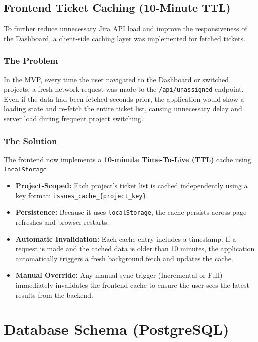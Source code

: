\documentclass[12pt, a4paper]{article}
\begin{document}
\subsection{Frontend Ticket Caching (10-Minute TTL)}

To further reduce unnecessary Jira API load and improve the responsiveness of the Dashboard, a client-side caching layer was implemented for fetched tickets.

\subsubsection{The Problem}
In the MVP, every time the user navigated to the Dashboard or switched projects, a fresh network request was made to the \texttt{/api/unassigned} endpoint. Even if the data had been fetched seconds prior, the application would show a loading state and re-fetch the entire ticket list, causing unnecessary delay and server load during frequent project switching.

\subsubsection{The Solution}
The frontend now implements a \textbf{10-minute Time-To-Live (TTL)} cache using \texttt{localStorage}. 

\begin{itemize}
    \item \textbf{Project-Scoped:} Each project's ticket list is cached independently using a key format: \texttt{issues_cache_\{project_key\}}.
    \item \textbf{Persistence:} Because it uses \texttt{localStorage}, the cache persists across page refreshes and browser restarts.
    \item \textbf{Automatic Invalidation:} Each cache entry includes a timestamp. If a request is made and the cached data is older than 10 minutes, the application automatically triggers a fresh background fetch and updates the cache.
    \item \textbf{Manual Override:} Any manual sync trigger (Incremental or Full) immediately invalidates the frontend cache to ensure the user sees the latest results from the backend.
\end{itemize}


\section{Database Schema (PostgreSQL)}
\end{document}
